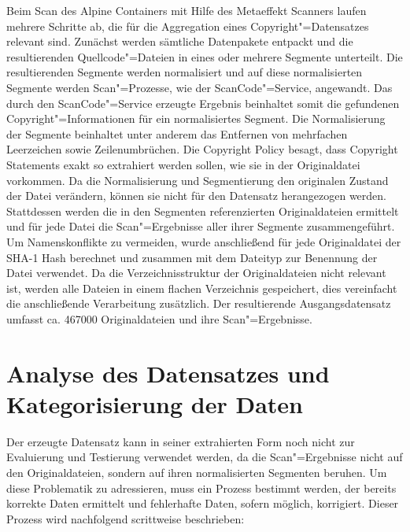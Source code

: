 Beim Scan des Alpine Containers mit Hilfe des Metaeffekt Scanners laufen mehrere Schritte ab, die für die Aggregation eines Copyright"=Datensatzes relevant sind.
Zunächst werden sämtliche Datenpakete entpackt und die resultierenden Quellcode"=Dateien in eines oder mehrere Segmente unterteilt.
Die resultierenden Segmente werden normalisiert und auf diese normalisierten Segmente werden Scan"=Prozesse, wie der ScanCode"=Service, angewandt.
Das durch den ScanCode"=Service erzeugte Ergebnis beinhaltet somit die gefundenen Copyright"=Informationen für ein normalisiertes Segment.
Die Normalisierung der Segmente beinhaltet unter anderem das Entfernen von mehrfachen Leerzeichen sowie Zeilenumbrüchen.
Die Copyright Policy besagt, dass Copyright Statements exakt so extrahiert werden sollen, wie sie in der Originaldatei vorkommen.
Da die Normalisierung und Segmentierung den originalen Zustand der Datei verändern, können sie nicht für den Datensatz herangezogen werden.
Stattdessen werden die in den Segmenten referenzierten Originaldateien ermittelt und für jede Datei die Scan"=Ergebnisse aller ihrer Segmente zusammengeführt.
Um Namenskonflikte zu vermeiden, wurde anschließend für jede Originaldatei der SHA-1 Hash berechnet und zusammen mit dem Dateityp zur Benennung der Datei verwendet.
Da die Verzeichnisstruktur der Originaldateien nicht relevant ist, werden alle Dateien in einem flachen Verzeichnis gespeichert, dies vereinfacht die anschließende Verarbeitung zusätzlich.
Der resultierende Ausgangsdatensatz umfasst ca. 467000 Originaldateien und ihre Scan"=Ergebnisse.

\section{Analyse des Datensatzes und Kategorisierung der Daten}

Der erzeugte Datensatz kann in seiner extrahierten Form noch nicht zur Evaluierung und Testierung verwendet werden, da die Scan"=Ergebnisse nicht auf den Originaldateien, sondern auf ihren normalisierten Segmenten beruhen.
Um diese Problematik zu adressieren, muss ein Prozess bestimmt werden, der bereits korrekte Daten ermittelt und fehlerhafte Daten, sofern möglich, korrigiert.
Dieser Prozess wird nachfolgend scrittweise beschrieben:

